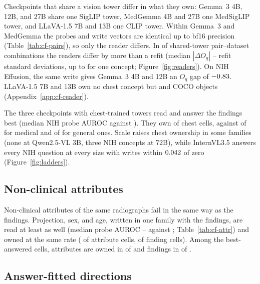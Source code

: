 \documentclass[11pt]{article}
\begin{document}
Checkpoints that share a vision tower differ in what they own: Gemma~3 4B, 12B, and 27B share one SigLIP \citep{zhai2023siglip} tower, MedGemma 4B and 27B one MedSigLIP \citep{sellergren2025medgemma} tower, and LLaVA-1.5 7B and 13B one CLIP \citep{radford2021clip} tower. Within Gemma~3 and MedGemma the probes and write vectors are identical up to bf16 precision (Table~\ref{tab:cf-pairs}), so only the reader differs. In \cfPairsRatioAboveOne{} of \cfPairsRatioN{} shared-tower pair--dataset combinations the readers differ by more than a refit (median $|\Delta O_q|$ \cfPairsRatioMin{}--\cfPairsRatioMax{} refit standard deviations, up to \cfPairsRatioSingleMax{} for one concept; Figure~\ref{fig:readers}). On NIH Effusion, the same write gives Gemma~3 4B and 12B an $O_q$ gap of $-0.83$. LLaVA-1.5 7B and 13B own no chest concept but \cfLlavaSevenCoco{} and \cfLlavaThirteenCoco{} COCO objects (Appendix~\ref{app:cf-reader}).

The three checkpoints with chest-trained towers read and answer the findings best (median NIH probe AUROC \cfSpecTowerProbeAuroc{} against \cfSpecRestProbeAuroc{}). They own \cfSpecTowerOwned{} of \cfSpecTowerN{} chest cells, against \cfSpecMedOwned{} of \cfSpecMedN{} for medical and \cfSpecGenOwned{} of \cfSpecGenN{} for general ones. Scale raises chest ownership in some families (none at Qwen2.5-VL 3B, three NIH concepts at 72B), while InternVL3.5 answers every NIH question at every size with writes within $0.042$ of zero (Figure~\ref{fig:ladders}).

\subsection{Non-clinical attributes}
\label{sec:attributes}

Non-clinical attributes of the same radiographs fail in the same way as the findings. Projection, sex, and age, written in one family with the findings, are read at least as well (median probe AUROC \cfAttrAurocMin{}--\cfAttrAurocMax{} against \cfAttrClinAuroc{}; Table~\ref{tab:cf-attr}) and owned at the same rate (\cfAttrAllAttrOwned{} of \cfAttrAllAttrN{} attribute cells, \cfAttrAllClinOwned{} of \cfAttrAllClinN{} finding cells). Among the best-answered cells, attributes are owned in \cfStratAttrTopOwned{} of \cfStratAttrTopN{} and findings in \cfStratFindTopOwned{} of \cfStratFindTopN{}.

\subsection{Answer-fitted directions}
\label{sec:ansdir}
\end{document}
